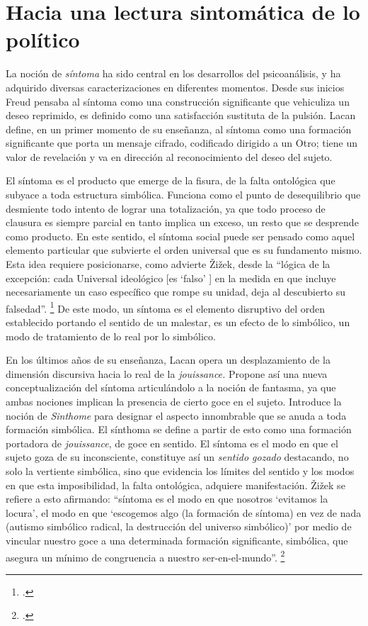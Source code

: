 \section{Hacia una lectura sintomática de lo político}

La noción de \emph{síntoma} ha sido central en los desarrollos del psicoanálisis, y ha adquirido diversas caracterizaciones en diferentes momentos. Desde sus inicios Freud pensaba al síntoma como una construcción significante que vehiculiza un deseo reprimido, es definido como una satisfacción sustituta de la pulsión. Lacan define, en un primer momento de su enseñanza, al síntoma como una formación significante que porta un mensaje cifrado, codificado dirigido a un Otro; tiene un valor de revelación y va en dirección al reconocimiento del deseo del sujeto.

El síntoma es el producto que emerge de la fisura, de la falta ontológica que subyace a toda estructura simbólica. Funciona como el punto de desequilibrio que desmiente todo intento de lograr una totalización, ya que todo proceso de clausura es siempre parcial en tanto implica un exceso, un resto que se desprende como producto. En este sentido, el síntoma social puede ser pensado como aquel elemento particular que subvierte el orden universal que es su fundamento mismo. Esta idea requiere posicionarse, como advierte Žižek, desde la \enquote{lógica de la excepción: cada Universal ideológico [es \enquote{falso} ] en la medida en que incluye necesariamente un caso específico que rompe su unidad, deja al descubierto su falsedad}. \footcite[][47]{@7111-ZIZEK2003} De este modo, un síntoma es el elemento disruptivo del orden establecido portando el sentido de un malestar, es un efecto de lo simbólico, un modo de tratamiento de lo real por lo simbólico.

En los últimos años de su enseñanza, Lacan opera un desplazamiento de la dimensión discursiva hacia lo real de la \emph{jouissance.} Propone así una nueva conceptualización del síntoma articulándolo a la noción de fantasma, ya que ambas nociones implican la presencia de cierto goce en el sujeto. Introduce la noción de \emph{Sinthome} para designar el aspecto innombrable que se anuda a toda formación simbólica. El sínthoma se define a partir de esto como una formación portadora de \emph{jouissance}, de goce en sentido. El síntoma es el modo en que el sujeto goza de su inconsciente, constituye así un \emph{sentido gozado} destacando, no solo la vertiente simbólica, sino que evidencia los límites del sentido y los modos en que esta imposibilidad, la falta ontológica, adquiere manifestación. Žižek se refiere a esto afirmando: \enquote{síntoma es el modo en que nosotros \enquote{evitamos la locura}, el modo en que \enquote{escogemos algo (la formación de síntoma) en vez de nada (autismo simbólico radical, la destrucción del universo simbólico)} por medio de vincular nuestro goce a una determinada formación significante, simbólica, que asegura un mínimo de congruencia a nuestro ser-en-el-mundo}. \footcite[][110-111]{@7111-ZIZEK2003}


